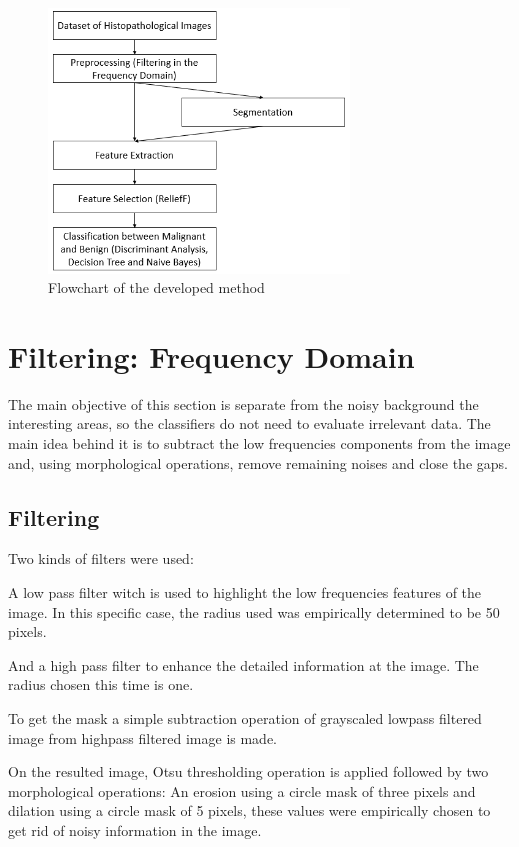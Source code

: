\documentclass[conference]{IEEEtran}
\begin{document}
\begin{figure}[h]
    \centering
    \includegraphics[width=8cm]{images/imagem3.png}
    \caption{Flowchart of the developed method}
    \label{fig:my_label}
\end{figure}

\section{Filtering: Frequency Domain}
The main objective of this section is separate from the noisy background the interesting areas, so the classifiers do not need to evaluate irrelevant data.
The main idea behind it is to subtract the low frequencies components from the image and, using morphological operations, remove remaining noises and close the gaps.
\subsection{Filtering}
	Two kinds of filters were used:\\
	\par A low pass filter witch is used to highlight the low frequencies features of the image. In this specific case, the radius used was empirically determined to be 50 pixels.
	
	\par And a high pass filter to enhance the detailed information at the image. The radius chosen this time is one.
	
	\par To get the mask a simple subtraction operation of grayscaled lowpass filtered image from highpass filtered image is made.

	\par On the resulted image, Otsu thresholding
	operation is applied followed by two morphological operations: An erosion using a circle mask of three pixels and dilation using a circle mask of 5 pixels, these values were empirically chosen to get rid of noisy information in the image.
	
\end{document}
